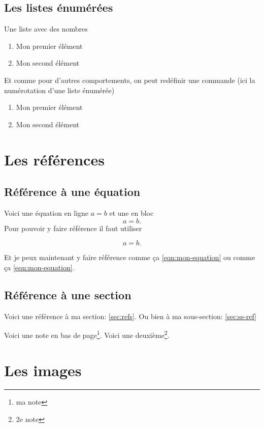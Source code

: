 \documentclass[a4paper,11pt]{article}
\begin{document}
\subsection{Les listes énumérées}
Une liste avec des nombres
\begin{enumerate}
	\item Mon premier élément
	\item Mon second élément
\end{enumerate}
Et comme pour d'autres comportements, on peut redéfinir une commande (ici la numérotation d'une liste énumérée)
\renewcommand{\theenumi}{\Roman{enumi}}

\begin{enumerate}
	\item Mon premier élément
	\item Mon second élément
\end{enumerate}

\newpage
\section{Les références\label{sec:refs}}
	
	\subsection{Référence à une équation}
	Voici une équation en ligne $a = b$ et une en bloc \[a = b.\] Pour pouvoir y faire référence il faut utiliser
	
	\begin{equation}
		a = b. \label{eqn:mon-equation}
	\end{equation}
	
	Et je peux maintenant y faire référence comme ça \ref{eqn:mon-equation} ou comme ça \eqref{eqn:mon-equation}.
	
	\subsection{Référence à une section\label{sec:ss-ref}}
		
	Voici une référence à ma section: \ref{sec:refs}.
	Ou bien à ma sous-section: \ref{sec:ss-ref}
	
	\blindtext
	
	Voici une note en bas de page\footnote{ma note}.
	Voici une deuxième\footnote{2e note}.
	
	\newpage
	
	\section{Les images}
	
\end{document}
